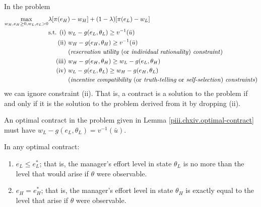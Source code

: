 \begin{lem}\label{piii.chxiv.optimal-contract}
    In the problem 
    \begin{equation*}
        \begin{aligned}
            \max_{w_H, e_H \geq 0, w_L, e_L > 0} &\lambda [\pi(e_H) - w_H] + (1 - \lambda) [\pi(e_L) - w_L] \\
            &\begin{aligned}
                \text{s.t. (i) } &w_L - g(e_L, \theta_L) \geq v^{-1}(\bar{u}) \\
                \text{(ii) } &w_H - g(e_H, \theta_H) \geq v^{-1}(\bar{u}) \\
                &\text{(\emph{reservation utility} (or \emph{individual rationality}) \emph{constraint})} \\
                \text{(iii) } & w_H - g(e_H, \theta_H) \geq w_L - g(e_L, \theta_H) \\
                \text{(iv) } &w_L - g(e_L, \theta_L) \geq w_H - g(e_H, \theta_L) \\
                &\text{(\emph{incentive compatibility} (or \emph{truth-telling} or \emph{self-selection}) \emph{constraints})}
            \end{aligned}
        \end{aligned}
    \end{equation*}
    we can ignore constraint (ii). That is, a contract is a solution to the problem if and only if it is the solution to the problem derived from it by dropping (ii).
\end{lem}

\begin{lem}
    An optimal contract in the problem given in Lemma \ref{piii.chxiv.optimal-contract} must have $w_L - g(e_L, \theta_L) = v^{-1}(\bar{u})$.
\end{lem}

\begin{lem}
    In any optimal contract:
    \begin{enumerate}
        \item $e_L \leq e^*_L$; that is, the manager's effort level in state $\theta_L$ is no more than the level that would arise if $\theta$ were observable.
        \item $e_H = e^*_H$; that is, the manager's effort level in state $\theta_H$ is exactly equal to the level that arise if $\theta$ were observable.
    \end{enumerate}
\end{lem}

